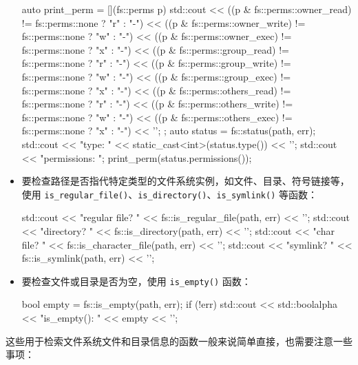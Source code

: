 \begin{itemize}
\begin{cpp}
auto print_perm = [](fs::perms p)
{
    std::cout
        << ((p & fs::perms::owner_read) != fs::perms::none ?
            "r" : "-")
        << ((p & fs::perms::owner_write) != fs::perms::none ?
            "w" : "-")
        << ((p & fs::perms::owner_exec) != fs::perms::none ?
            "x" : "-")
        << ((p & fs::perms::group_read) != fs::perms::none ?
            "r" : "-")
        << ((p & fs::perms::group_write) != fs::perms::none ?
            "w" : "-")
        << ((p & fs::perms::group_exec) != fs::perms::none ?
            "x" : "-")
        << ((p & fs::perms::others_read) != fs::perms::none ?
            "r" : "-")
        << ((p & fs::perms::others_write) != fs::perms::none ?
            "w" : "-")
        << ((p & fs::perms::others_exec) != fs::perms::none ?
            "x" : "-")
        << '\n';
};
auto status = fs::status(path, err);
std::cout << "type: " << static_cast<int>(status.type()) << '\n';
std::cout << "permissions: ";
print_perm(status.permissions());
\end{cpp}

\item
要检查路径是否指代特定类型的文件系统实例，如文件、目录、符号链接等，使用 \verb|is_regular_file()|、\verb|is_directory()|、\verb|is_symlink()| 等函数：

\begin{cpp}
std::cout << "regular file? " <<
          fs::is_regular_file(path, err) << '\n';
std::cout << "directory? " <<
          fs::is_directory(path, err) << '\n';
std::cout << "char file? " <<
          fs::is_character_file(path, err) << '\n';
std::cout << "symlink? " <<
          fs::is_symlink(path, err) << '\n';
\end{cpp}

\item
要检查文件或目录是否为空，使用 \verb|is_empty()| 函数：

\begin{cpp}
bool empty = fs::is_empty(path, err);
if (!err)
{
    std::cout << std::boolalpha
    << "is_empty(): " << empty << '\n';
}
\end{cpp}
\end{itemize}


这些用于检索文件系统文件和目录信息的函数一般来说简单直接，也需要注意一些事项：

